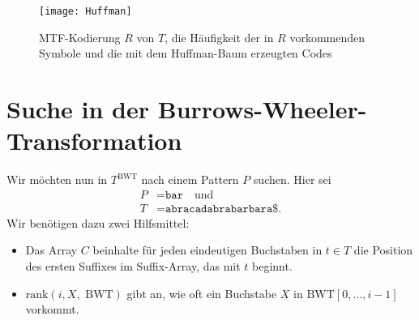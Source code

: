\begin{figure}[H]
  \texttt{[image: Huffman]}
  \caption{MTF-Kodierung \( R \) von \( T \), die Häufigkeit der in \( R \) vorkommenden Symbole und die mit dem Huffman-Baum erzeugten Codes}
\end{figure}

\section{Suche in der Burrows-Wheeler-Transformation}

Wir möchten nun in \( T^{\text{BWT}} \) nach einem Pattern \( P \) suchen. Hier sei
\begin{align*}
  P &= \texttt{bar} \quad \text{und} \\
  T &= \texttt{abracadabrabarbara\$}\text{.}
\end{align*}
Wir benötigen dazu zwei Hilfsmittel:

\begin{itemize}
  \item Das Array \( C \) beinhalte für jeden eindeutigen Buchstaben in \( t \in T \) die Position des ersten Suffixes im Suffix-Array, das mit \( t \) beginnt.
  \item \( \text{rank}(i,X,\text{ BWT}) \) gibt an, wie oft ein Buchstabe \( X \) in \( \text{BWT}[0,\dots,i-1] \) vorkommt.
\end{itemize}